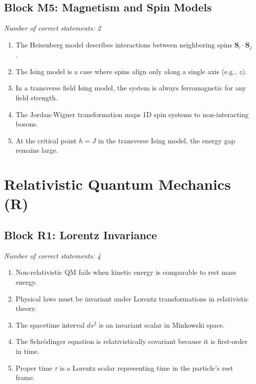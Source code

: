 \documentclass[a4paper,12pt]{article}
\begin{document}
\subsection*{Block M5: Magnetism and Spin Models}
\textit{Number of correct statements: 2}
\begin{enumerate}[label=\roman*.]
    \item The Heisenberg model describes interactions between neighboring spins $\mathbf{S}_i \cdot \mathbf{S}_j$.
    \item The Ising model is a case where spins align only along a single axis (e.g., $z$).
    \item In a transverse field Ising model, the system is always ferromagnetic for any field strength.
    \item The Jordan-Wigner transformation maps 1D spin systems to non-interacting bosons.
    \item At the critical point $h=J$ in the transverse Ising model, the energy gap remains large.
\end{enumerate}

\newpage

\section{Relativistic Quantum Mechanics (R)}

\subsection*{Block R1: Lorentz Invariance}
\textit{Number of correct statements: 4}
\begin{enumerate}[label=\roman*.]
    \item Non-relativistic QM fails when kinetic energy is comparable to rest mass energy.
    \item Physical laws must be invariant under Lorentz transformations in relativistic theory.
    \item The spacetime interval $ds^2$ is an invariant scalar in Minkowski space.
    \item The Schrödinger equation is relativistically covariant because it is first-order in time.
    \item Proper time $\tau$ is a Lorentz scalar representing time in the particle's rest frame.
\end{enumerate}
\end{document}
